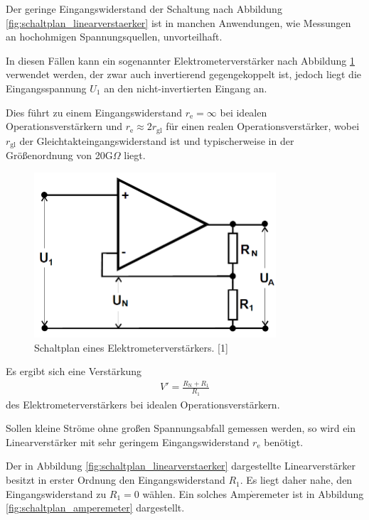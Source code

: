 Der geringe Eingangswiderstand der Schaltung nach Abbildung \ref{fig:schaltplan_linearverstaerker} ist in manchen Anwendungen, wie Messungen an hochohmigen Spannungsquellen, unvorteilhaft.

In diesen Fällen kann ein sogenannter Elektrometerverstärker nach Abbildung \ref{fig:schaltplan_elektrometerverstaerker} verwendet werden, der zwar auch invertierend gegengekoppelt ist, jedoch liegt die Eingangsspannung $U_1$ an den nicht-invertierten Eingang an. 

Dies führt zu einem Eingangswiderstand $r_\text{e}=\infty$ bei idealen Operationsverstärkern und $r_\text{e}\approx 2r_{\text{gl}}$ für einen realen Operationsverstärker, wobei $r_{\text{gl}}$ der Gleichtakteingangswiderstand ist und typischerweise in der Größenordnung von 20G$\Omega$ liegt.
\begin{figure}[H]
\centering
\includegraphics[width=9cm]{images/schaltplan_elektrometerverstaerker.png}
\caption{Schaltplan eines Elektrometerverstärkers. [1]}
\label{fig:schaltplan_elektrometerverstaerker}
\end{figure}
Es ergibt sich eine Verstärkung
\begin{align}
V'=\frac{R_\text{N}+R_1}{R_1}
\end{align}
des Elektrometerverstärkers bei idealen Operationsverstärkern.

Sollen kleine Ströme ohne großen Spannungsabfall gemessen werden, so wird ein Linearverstärker mit sehr geringem Eingangswiderstand $r_\text{e}$ benötigt. 

Der in Abbildung \ref{fig:schaltplan_linearverstaerker} dargestellte Linearverstärker besitzt in erster Ordnung den Eingangswiderstand $R_1$. Es liegt daher nahe, den Eingangswiderstand zu $R_1=0$ wählen. Ein solches Amp$\grave{\text{e}}$remeter ist in Abbildung \ref{fig:schaltplan_amperemeter} dargestellt.

